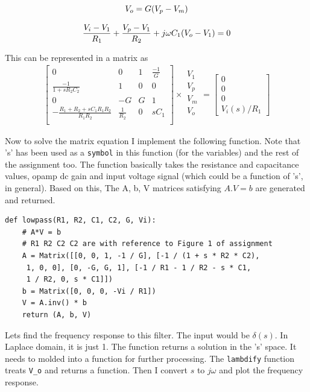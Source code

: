 \documentclass[11pt, a4paper]{article}
\begin{document}
\begin{equation}
\centering
	 V_o = G(V_p - V_m)  
\end{equation}

\begin{equation}
\centering
	 \frac{V_i - V_1}{R_1} + \frac{V_p - V_1}{R_2} + j \omega C_1(V_o - V_1) = 0	   
\end{equation}

This can be represented in a matrix as 
\begin{gather}
 \begin{bmatrix} 
 0 & 0 & 1 & \frac{-1}{G} \\
 \frac{-1}{1+sR_2C_2} & 1 & 0 & 0 \\
 0 & -G & G & 1\\
 -\frac{R_1+R_2+sC_1R_1R_2}{R_1R_2} & \frac{1}{R_2} & 0 & sC_1\\ \end{bmatrix} \times 
 \begin{matrix}
  V_1 \\
  V_p\\
  V_m \\
  V_o\\
 \end{matrix}
 =
  \begin{bmatrix}
   0\\
   0\\
   0\\
   V_i(s)/R_1 
   \end{bmatrix}
\end{gather}

Now to solve the matrix equation I implement the following function. Note that 's' has been used as a \texttt{symbol} in this function (for the variables) and the rest of the assignment too. The function basically takes the resistance and capacitance values, opamp dc gain and input voltage signal (which could be a function of 's', in general). Based on this, The A, b, V matrices satisfying $A.V=b$ are generated and returned.
\begin{verbatim}
def lowpass(R1, R2, C1, C2, G, Vi):
    # A*V = b
    # R1 R2 C2 C2 are with reference to Figure 1 of assignment
    A = Matrix([[0, 0, 1, -1 / G], [-1 / (1 + s * R2 * C2),
     1, 0, 0], [0, -G, G, 1], [-1 / R1 - 1 / R2 - s * C1, 
     1 / R2, 0, s * C1]])
    b = Matrix([0, 0, 0, -Vi / R1])
    V = A.inv() * b
    return (A, b, V)
\end{verbatim}

Lets find the frequency response to this filter. The input would be $\delta(s)$. In Laplace domain, it is just 1. The function returns a solution in the 's' space. It needs to molded into a function for further processing. The \texttt{lambdify} function treats \texttt{V\_o} and returns a function. Then I convert $s$ to $j\omega$ and plot the frequency response. 
\end{document}
